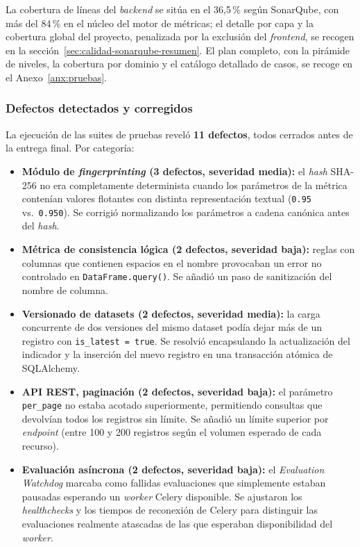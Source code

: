 La cobertura de líneas del \emph{backend} se sitúa en el 36,5\,\% según
SonarQube, con más del 84\,\% en el núcleo del motor de métricas; el detalle
por capa y la cobertura global del proyecto, penalizada por la exclusión del
\emph{frontend}, se recogen en la sección~\ref{sec:calidad-sonarqube-resumen}.
El plan completo, con la pirámide de niveles, la cobertura por dominio y el
catálogo detallado de casos, se recoge en el Anexo~\ref{anx:pruebas}.

\subsubsection{Defectos detectados y corregidos}

La ejecución de las suites de pruebas reveló \textbf{11 defectos}, todos
cerrados antes de la entrega final.  Por categoría:

\begin{itemize}
  \item \textbf{Módulo de \emph{fingerprinting} (3 defectos, severidad
    media):} el \emph{hash} \ac{SHA}-256 no era completamente determinista
    cuando los parámetros de la métrica contenían valores flotantes con
    distinta representación textual (\texttt{0.95} vs.\ \texttt{0.950}).
    Se corrigió normalizando los parámetros a cadena canónica antes del
    \emph{hash}.

  \item \textbf{Métrica de consistencia lógica (2 defectos, severidad
    baja):} reglas con columnas que contienen espacios en el nombre
    provocaban un error no controlado en \texttt{DataFrame.query()}.
    Se añadió un paso de sanitización del nombre de columna.

  \item \textbf{Versionado de datasets (2 defectos, severidad media):}
    la carga concurrente de dos versiones del mismo dataset podía dejar
    más de un registro con \texttt{is\_latest\,=\,true}.  Se resolvió
    encapsulando la actualización del indicador y la inserción del nuevo
    registro en una transacción atómica de SQLAlchemy.

  \item \textbf{API REST, paginación (2 defectos, severidad baja):}
    el parámetro \texttt{per\_page} no estaba acotado superiormente,
    permitiendo consultas que devolvían todos los registros sin límite.
    Se añadió un límite superior por \emph{endpoint} (entre 100 y 200
    registros según el volumen esperado de cada recurso).

  \item \textbf{Evaluación asíncrona (2 defectos, severidad baja):}
    el \emph{Evaluation Watchdog} marcaba como fallidas evaluaciones que
    simplemente estaban pausadas esperando un \emph{worker} Celery
    disponible.  Se ajustaron los \emph{healthchecks} y los tiempos de
    reconexión de Celery para distinguir las evaluaciones realmente
    atascadas de las que esperaban disponibilidad del \emph{worker}.
\end{itemize}

